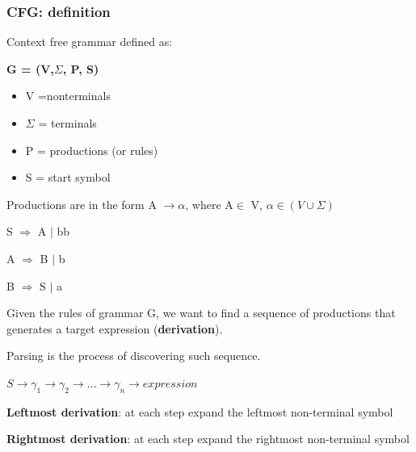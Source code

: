 \begin{frame}
    \frametitle{CFG: definition}
    Context free grammar defined as:
    \begin{center}
        \textbf{G = (V,$\Sigma$, P, S)}
    \end{center}
    \begin{itemize}
        \item V =nonterminals
        \item $\Sigma$ = terminals
        \item P = productions (or rules)
        \item S = start symbol
    \end{itemize}
    Productions are in the form A $\rightarrow \alpha$, where A$\in$ V, $\alpha \in (V \cup \Sigma)$

    S $\Rightarrow$ A $|$ bb
    
    A $\Rightarrow$ B $|$ b 
   
    B $\Rightarrow$ S $|$ a
\end{frame}
\begin{frame}
    
        \begin{block}{}
        Given the rules of grammar G, we want to find a sequence of productions that 
        generates a target expression (\textbf{derivation}).
    
        
        \end{block}
        \begin{block}{}
        Parsing is the process of discovering such sequence.
        \end{block}
        
        $ S \rightarrow \gamma_{1} \rightarrow \gamma_{2} \rightarrow \dots \rightarrow \gamma_{n} \rightarrow expression$
        
        \begin{block}{}\textbf{Leftmost derivation}: at each step expand the leftmost non-terminal symbol\end{block}
        
        \begin{block}{}\textbf{Rightmost derivation}: at each step expand the rightmost non-terminal symbol\end{block}
        
\end{frame}
